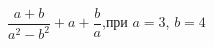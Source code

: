 \begin{ex}[type=simplify_calculate]
	\begin{condition}
		\( \dfrac{a+b}{a^2-b^2}+a+\dfrac{b}{a} \),\quad при \( a=3 \), \( b=4 \)
	\end{condition}
\end{ex}
